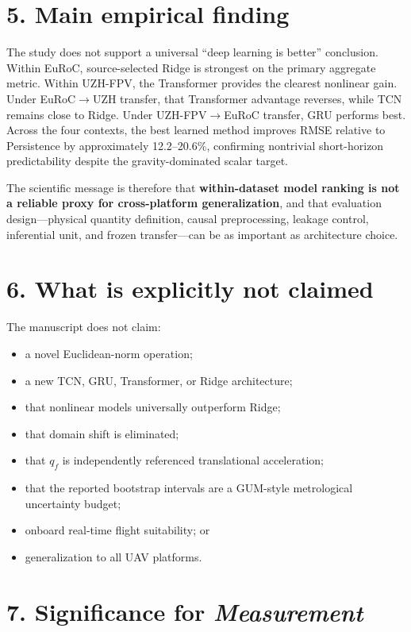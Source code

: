 \documentclass[12pt,a4paper]{article}
\begin{document}
\section*{5. Main empirical finding}

The study does not support a universal ``deep learning is better'' conclusion. Within EuRoC, source-selected Ridge is strongest on the primary aggregate metric. Within UZH-FPV, the Transformer provides the clearest nonlinear gain. Under EuRoC$\rightarrow$UZH transfer, that Transformer advantage reverses, while TCN remains close to Ridge. Under UZH-FPV$\rightarrow$EuRoC transfer, GRU performs best. Across the four contexts, the best learned method improves RMSE relative to Persistence by approximately 12.2--20.6\%, confirming nontrivial short-horizon predictability despite the gravity-dominated scalar target.

The scientific message is therefore that \textbf{within-dataset model ranking is not a reliable proxy for cross-platform generalization}, and that evaluation design---physical quantity definition, causal preprocessing, leakage control, inferential unit, and frozen transfer---can be as important as architecture choice.

\section*{6. What is explicitly not claimed}

The manuscript does not claim:
\begin{itemize}[leftmargin=*]
    \item a novel Euclidean-norm operation;
    \item a new TCN, GRU, Transformer, or Ridge architecture;
    \item that nonlinear models universally outperform Ridge;
    \item that domain shift is eliminated;
    \item that $q_f$ is independently referenced translational acceleration;
    \item that the reported bootstrap intervals are a GUM-style metrological uncertainty budget;
    \item onboard real-time flight suitability; or
    \item generalization to all UAV platforms.
\end{itemize}

\section*{7. Significance for \emph{Measurement}}
\end{document}
